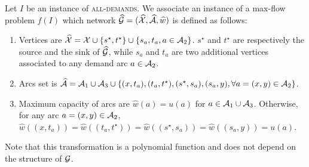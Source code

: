 \begin{bibunit}[ieeetr]
Let $I$ be an instance of \textsc{all-demands}. We associate an instance of a max-flow problem $f(I)$ 
which network $\widehat{\cal G}=(\widehat{\cal X},\widehat{\cal A}, \widehat{w})$ is defined
as follows:
\begin{enumerate}
\item
Vertices are $\widehat{\cal X}={\cal X} \cup \{s^\star, t^\star\}\cup \{s_a, t_a, a\in {\cal A}_2\}$. $s^\star$ and $t^\star$ are respectively
the source and the sink of $\widehat{\cal G}$, while $s_a$ and $t_a$ are two additional vertices associated to any demand arc $a\in {\cal A}_2$.
\item
Arcs set is $\widehat{\cal A}={\cal A}_1 \cup {\cal A}_3 \cup \{ (x,t_a), (t_a,t^\star), (s^\star, s_a), (s_a,y), \forall a=(x,y)\in {\cal A}_2\}$.
\item
Maximum capacity of arcs are $\widehat{w}(a)=u(a)$ for $a\in {\cal A}_1 \cup {\cal A}_3$.
Otherwise, for any arc $a=(x,y)\in {\cal A}_2$, 
$\widehat{w}((x,t_a))=\widehat{w}((t_a,t^\star))=\widehat{w}((s^\star, s_a))=\widehat{w}( (s_a,y))=u(a)$.
\end{enumerate}
Note that this transformation is a polynomial function and does not depend on  the structure
of ${\cal G}$.


\end{bibunit}
